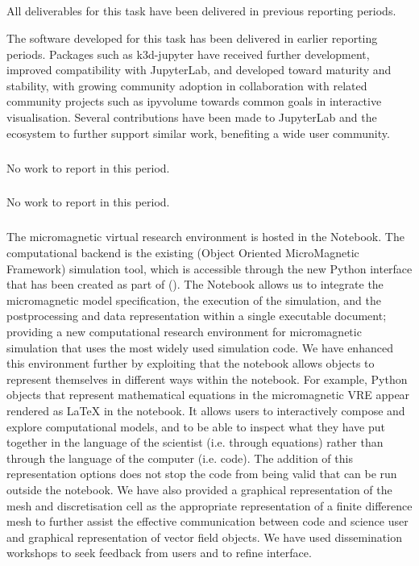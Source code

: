 \smallskip
\subparagraph{}
\label{UI@vis3d}

All deliverables for this task have been delivered in previous reporting periods.

The software developed for this task has been delivered in earlier reporting periods.
Packages such as k3d-jupyter have received further development,
improved compatibility with JupyterLab,
and developed toward maturity and stability,
with growing community adoption
in collaboration with related community projects such as ipyvolume towards common goals
in interactive visualisation.
Several contributions have been made to JupyterLab and
the \Jupyter ecosystem to further support similar work,
benefiting a wide user community.

\smallskip
\subparagraph{} %
\label{UI@cfd-vis}

No work to report in this period.


\smallskip
\subparagraph{} %

No work to report in this period.

\smallskip
\subparagraph{} %
\label{UI@oommf-py-ipython-attributes}

The micromagnetic virtual research environment is hosted in the
\Jupyter Notebook. The computational backend is the existing \OOMMF
(Object Oriented MicroMagnetic Framework) simulation tool, which is
accessible through the new Python interface that has been created as
part of \ODK
(). The
\Jupyter Notebook allows us to integrate the micromagnetic model
specification, the execution of the simulation, and the postprocessing
and data representation within a single executable document; providing
a new computational research environment for micromagnetic simulation
that uses the most widely used simulation code. We have enhanced this
environment further by exploiting that the notebook allows objects to
represent themselves in different ways within the notebook. For
example, Python objects that represent mathematical equations in the
micromagnetic VRE appear rendered as \LaTeX{} in the notebook. It
allows users to interactively compose and explore computational
models, and to be able to inspect what they have put together in the
language of the scientist (i.e. through equations) rather than through
the language of the computer (i.e. code). The addition of this
representation options does not stop the code from being valid \Python
that can be run outside the notebook. We have also provided a
graphical representation of the mesh and discretisation cell as the
appropriate representation of a finite difference mesh to further
assist the effective communication between code and science user and
graphical representation of vector field objects.  We have used
dissemination workshops to seek feedback from users and to refine
interface.

